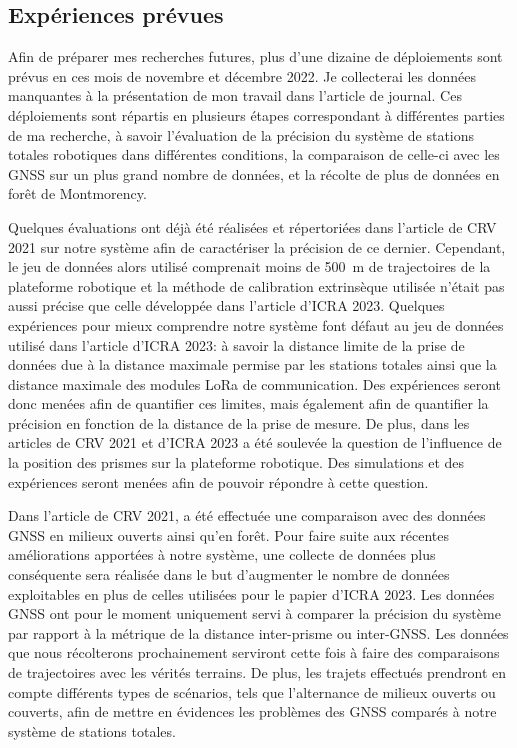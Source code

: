 \subsection{Expériences prévues}

Afin de préparer mes recherches futures, plus d'une dizaine de déploiements sont prévus en ces mois de novembre et décembre 2022.
Je collecterai les données manquantes à la présentation de mon travail dans l'article de journal.
Ces déploiements sont répartis en plusieurs étapes correspondant à différentes parties de ma recherche, à savoir l'évaluation de la précision du système de stations totales robotiques dans différentes conditions, la comparaison de celle-ci avec les \ac{GNSS} sur un plus grand nombre de données, et la récolte de plus de données en forêt de Montmorency.

Quelques évaluations ont déjà été réalisées et répertoriées dans l'article de CRV 2021 sur notre système afin de caractériser la précision de ce dernier.
Cependant, le jeu de données alors utilisé comprenait moins de \SI{500}{m} de trajectoires de la plateforme robotique et la méthode de calibration extrinsèque utilisée n'était pas aussi précise que celle développée dans l'article d'ICRA 2023.
Quelques expériences pour mieux comprendre notre système font défaut au jeu de données utilisé dans l'article d'ICRA 2023: à savoir la distance limite de la prise de données due à la distance maximale permise par les stations totales ainsi que la distance maximale des modules LoRa de communication.
Des expériences seront donc menées afin de quantifier ces limites, mais également afin de quantifier la précision en fonction de la distance de la prise de mesure. 
De plus, dans les articles de CRV 2021 et d'ICRA 2023 a été soulevée la question de l'influence de la position des prismes sur la plateforme robotique.
Des simulations et des expériences seront menées afin de pouvoir répondre à cette question.

Dans l'article de CRV 2021, a été effectuée une comparaison avec des données \ac{GNSS} en milieux ouverts ainsi qu'en forêt.
Pour faire suite aux récentes améliorations apportées à notre système, une collecte de données plus conséquente sera réalisée dans le but d'augmenter le nombre de données exploitables en plus de celles utilisées pour le papier d'ICRA 2023. 
Les données \ac{GNSS} ont pour le moment uniquement servi à comparer la précision du système par rapport à la métrique de la distance inter-prisme ou inter-\ac{GNSS}.
Les données que nous récolterons prochainement serviront cette fois à faire des comparaisons de trajectoires avec les vérités terrains.
De plus, les trajets effectués prendront en compte différents types de scénarios, tels que l'alternance de milieux ouverts ou couverts, afin de mettre en évidences les problèmes des \ac{GNSS} comparés à notre système de stations totales.

